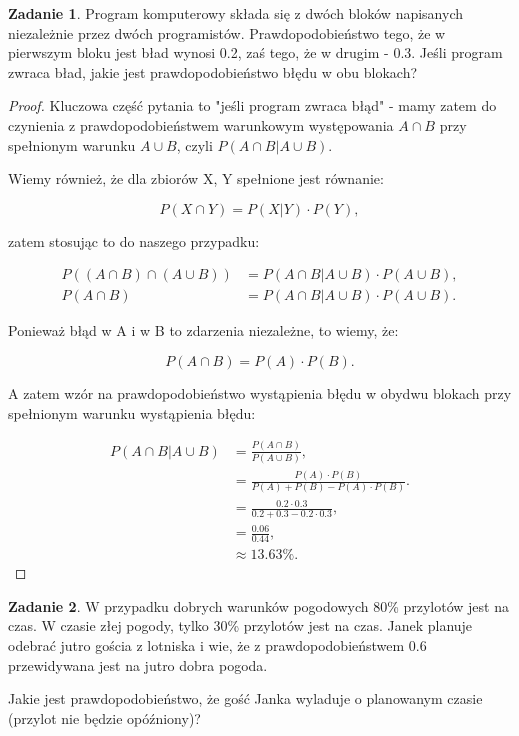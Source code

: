 \documentclass[11pt]{article}
\theoremstyle{definition}
\newtheorem{zadanie}{Zadanie}
\numberwithin{zadanie}{section}
\begin{document}
\begin{zadanie}
    Program komputerowy składa się z dwóch bloków napisanych niezależnie przez dwóch programistów. Prawdopodobieństwo tego, że w pierwszym bloku jest bład wynosi 0.2, zaś tego, że w drugim - 0.3. Jeśli program zwraca bład, jakie jest prawdopodobieństwo błędu w obu blokach?
\end{zadanie}
\begin{proof}
    Kluczowa część pytania to "jeśli program zwraca błąd" - mamy zatem do czynienia z prawdopodobieństwem warunkowym występowania $A\cap B$ przy spełnionym warunku $A\cup B$, czyli $P(A\cap B|A\cup B)$.

    Wiemy również, że dla zbiorów X, Y spełnione jest równanie:

    $$P(X\cap Y) = P(X|Y)\cdot P(Y),$$

    zatem stosując to do naszego przypadku:

    \begin{align*}
        P((A\cap B)\cap(A\cup B)) & = P(A\cap B|A\cup B)\cdot P(A\cup B), \\
        P(A\cap B)                & = P(A\cap B|A\cup B)\cdot P(A\cup B).
    \end{align*}

    Ponieważ błąd w A i w B to zdarzenia niezależne, to wiemy, że:

    $$ P(A\cap B) = P(A)\cdot P(B).$$

    A zatem wzór na prawdopodobieństwo wystąpienia błędu w obydwu blokach przy spełnionym warunku wystąpienia błędu:

    \begin{align*}
        P(A\cap B|A\cup B) & = \frac{P(A\cap B)}{P(A\cup B)},                   \\
                           & = \frac{P(A)\cdot P(B)}{P(A)+P(B)-P(A)\cdot P(B)}. \\
                           & = \frac{0.2\cdot 0.3}{0.2+0.3 - 0.2\cdot 0.3},     \\
                           & = \frac{0.06}{0.44},                               \\
                           & \approx 13.63\%.
    \end{align*}
\end{proof}

\begin{zadanie}
    W przypadku dobrych warunków pogodowych 80\% przylotów jest na czas. W czasie złej pogody, tylko 30\% przylotów jest na czas. Janek planuje odebrać jutro gościa z lotniska i wie, że z prawdopodobieństwem 0.6 przewidywana jest na jutro dobra pogoda.

    Jakie jest prawdopodobieństwo, że gość Janka wyladuje o planowanym czasie (przylot nie będzie opóźniony)?
\end{zadanie}
\end{document}
